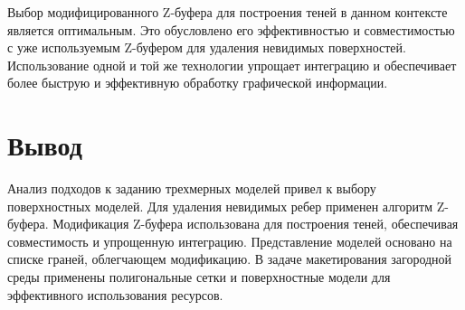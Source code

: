 Выбор модифицированного Z-буфера для построения теней в данном контексте является оптимальным. Это обусловлено его эффективностью и совместимостью с уже используемым Z-буфером для удаления невидимых поверхностей. Использование одной и той же технологии упрощает интеграцию и обеспечивает более быструю и эффективную обработку графической информации.

\section{Вывод}

Анализ подходов к заданию трехмерных моделей привел к выбору поверхностных моделей. Для удаления невидимых ребер применен алгоритм Z-буфера. Модификация Z-буфера использована для построения теней, обеспечивая совместимость и упрощенную интеграцию. Представление моделей основано на списке граней, облегчающем модификацию. В задаче макетирования загородной среды применены полигональные сетки и поверхностные модели для эффективного использования ресурсов.